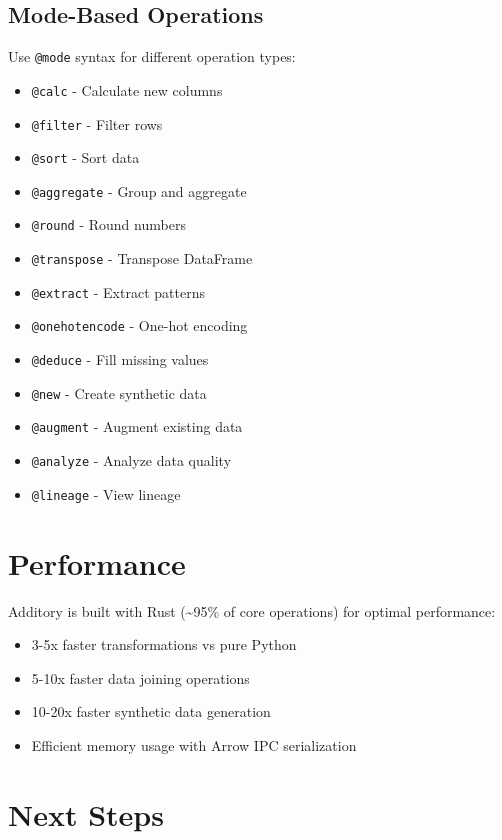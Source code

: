 \documentclass[
  letterpaper,
]{scrbook}
\providecommand{\tightlist}{%
  \setlength{\itemsep}{0pt}\setlength{\parskip}{0pt}}
\begin{document}
\subsection{Mode-Based Operations}\label{mode-based-operations}

Use \texttt{@mode} syntax for different operation types:

\begin{itemize}
\tightlist
\item
  \texttt{@calc} - Calculate new columns
\item
  \texttt{@filter} - Filter rows
\item
  \texttt{@sort} - Sort data
\item
  \texttt{@aggregate} - Group and aggregate
\item
  \texttt{@round} - Round numbers
\item
  \texttt{@transpose} - Transpose DataFrame
\item
  \texttt{@extract} - Extract patterns
\item
  \texttt{@onehotencode} - One-hot encoding
\item
  \texttt{@deduce} - Fill missing values
\item
  \texttt{@new} - Create synthetic data
\item
  \texttt{@augment} - Augment existing data
\item
  \texttt{@analyze} - Analyze data quality
\item
  \texttt{@lineage} - View lineage
\end{itemize}

\section{Performance}\label{performance}

Additory is built with Rust (\textasciitilde95\% of core operations) for
optimal performance:

\begin{itemize}
\tightlist
\item
  3-5x faster transformations vs pure Python
\item
  5-10x faster data joining operations
\item
  10-20x faster synthetic data generation
\item
  Efficient memory usage with Arrow IPC serialization
\end{itemize}

\section{Next Steps}\label{next-steps}
\end{document}
